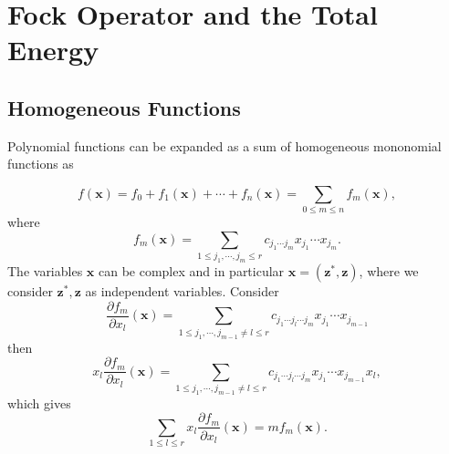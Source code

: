 \documentclass[aps,preprint]{revtex4}%
\begin{document}
\section{Fock Operator and the Total Energy\label{Fock&Energy}}

\subsection{Homogeneous Functions\label{HomFunc}}

Polynomial functions can be expanded as a sum of homogeneous mononomial
functions as%

\begin{equation}
f\left(  \mathbf{x}\right)  =f_{0}+f_{1}\left(  \mathbf{x}\right)
+\cdots+f_{n}\left(  \mathbf{x}\right)  =%
{\textstyle\sum\limits_{0\leq m\leq n}}
f_{m}\left(  \mathbf{x}\right)  ,
\end{equation}
where
\begin{equation}
f_{m}\left(  \mathbf{x}\right)  =%
{\textstyle\sum\limits_{1\leq j_{1},\cdots,j_{m}\leq r}}
c_{j_{1}\cdots j_{m}}x_{j_{1}}\cdots x_{j_{m}}.
\end{equation}
The variables $\mathbf{x}$ can be complex and in particular $\mathbf{x=}%
\left(  \mathbf{z}^{\ast}\mathbf{,z}\right)  $, where we consider
$\mathbf{z}^{\ast}\mathbf{,z}$ as independent variables. Consider
\begin{equation}
\frac{\partial f_{m}}{\partial x_{l}}\left(  \mathbf{x}\right)  =%
{\textstyle\sum\limits_{1\leq j_{1},\cdots,j_{m-1}\neq l\leq r}}
c_{j_{1}\cdots j_{l}\cdots j_{m}}x_{j_{1}}\cdots x_{j_{m-1}}%
\end{equation}
then
\begin{equation}
x_{l}\frac{\partial f_{m}}{\partial x_{l}}\left(  \mathbf{x}\right)  =%
{\textstyle\sum\limits_{1\leq j_{1},\cdots,j_{m-1}\neq l\leq r}}
c_{j_{1}\cdots j_{l}\cdots j_{m}}x_{j_{1}}\cdots x_{j_{m-1}}x_{l},
\end{equation}
which gives
\begin{equation}%
{\textstyle\sum\limits_{1\leq l\leq r}}
x_{l}\frac{\partial f_{m}}{\partial x_{l}}\left(  \mathbf{x}\right)
=mf_{m}\left(  \mathbf{x}\right)  .
\end{equation}
\end{document}
